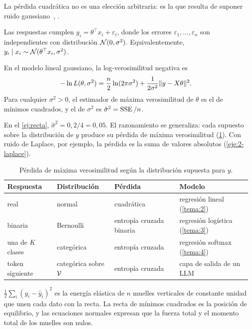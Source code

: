La pérdida cuadrática no es una elección arbitraria: es la que resulta de suponer ruido gaussiano~\cite[§1.3]{cs229}, \cite[§3.1.1]{bishop}.

\begin{definicion}
Las respuestas cumplen $y_i=\theta^{\top}x_i+\varepsilon_i$, donde los errores $\varepsilon_1,\dots,\varepsilon_n$ son independientes con distribución $\mathcal{N}(0,\sigma^{2})$. Equivalentemente, $y_i\mid x_i\sim\mathcal{N}(\theta^{\top}x_i,\sigma^{2})$.
\end{definicion}

\begin{teorema}\label{teo:mv-gauss}
En el modelo lineal gaussiano, la log-verosimilitud negativa es
\[
-\ln L(\theta,\sigma^{2})=\frac{n}{2}\ln(2\pi\sigma^{2})+\frac{1}{2\sigma^{2}}\lVert y-X\theta\rVert^{2}.
\]
Para cualquier $\sigma^{2}>0$, el estimador de máxima verosimilitud de $\theta$ es el de mínimos cuadrados, y el de $\sigma^{2}$ es $\hat\sigma^{2}=\operatorname{SSE}/n$.
\end{teorema}

En el \cref{ej:recta}, $\hat\sigma^{2}=0{,}2/4=0{,}05$. El razonamiento se generaliza: cada supuesto sobre la distribución de $y$ produce su pérdida de máxima verosimilitud (\cref{tab:mv}). Con ruido de Laplace, por ejemplo, la pérdida es la suma de valores absolutos (\cref{eje:2-laplace}).

\begin{table}[h]
\centering\small
\caption{Pérdida de máxima verosimilitud según la distribución supuesta para $y$.}\label{tab:mv}
\begin{tabular}{@{}llll@{}}
\toprule
Respuesta & Distribución & Pérdida & Modelo \\
\midrule
real & normal & cuadrática & regresión lineal (\cref{tema:2}) \\
binaria & Bernoulli & entropía cruzada binaria & regresión logística (\cref{tema:3}) \\
una de $K$ clases & categórica & entropía cruzada & regresión softmax (\cref{tema:4}) \\
token siguiente & categórica sobre $\mathcal{V}$ & entropía cruzada & capa de salida de un LLM \\
\bottomrule
\end{tabular}
\end{table}

\begin{observacion}[Física]
$\frac12\sum_i(y_i-\hat y_i)^{2}$ es la energía elástica de $n$ muelles verticales de constante unidad que unen cada dato con la recta. La recta de mínimos cuadrados es la posición de equilibrio, y las ecuaciones normales expresan que la fuerza total y el momento total de los muelles son nulos.
\end{observacion}

